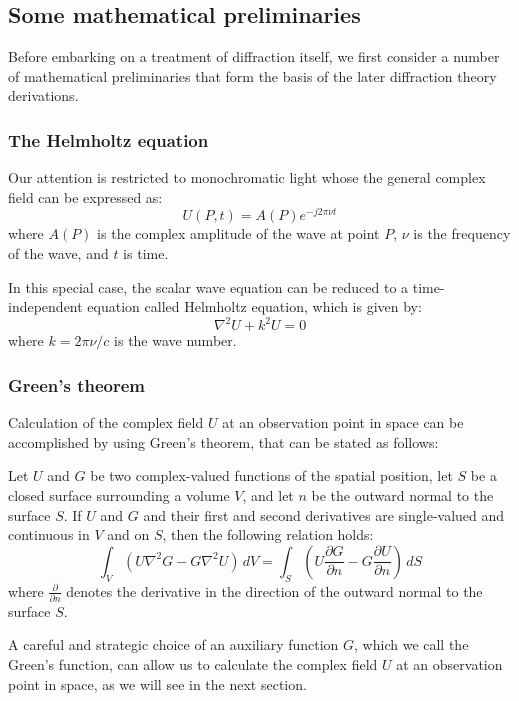 \documentclass{article}
\begin{document}
\subsection{Some mathematical preliminaries}
Before embarking on a treatment of diffraction itself, we first consider a number of
mathematical preliminaries that form the basis of the later diffraction theory derivations.
\subsubsection{The Helmholtz equation}
Our attention is restricted to monochromatic light whose the general complex field can be expressed as:
\begin{equation}
    U(P, t) = A(P) e^{-j2\pi \nu t}
\end{equation}
where $A(P)$ is the complex amplitude of the wave at point $P$, $\nu$ is the frequency of the wave, and $t$ is time.

In this special case, the scalar wave equation can be reduced to a time-independent equation called Helmholtz equation, which is given by:
\begin{equation}\label{eq:helmholtz_equation}
\nabla^2 U + k^2 U = 0
\end{equation}
where $k = 2\pi \nu / c$ is the wave number.

\subsubsection{Green's theorem}
Calculation of the complex field $U$ at an observation point in space can be accomplished by using Green's theorem, that can be stated as follows:
\begin{theorem}
Let $U$ and $G$ be two complex-valued functions of the spatial position, let $S$ be a closed surface surrounding a volume $V$, and let $n$ be the outward normal to the surface $S$. If $U$ and $G$ and their first and second derivatives are single-valued and continuous in $V$ and on $S$, then the following relation holds:
\begin{equation}\label{eq:green_theorem}
\int_V (U \nabla^2 G - G \nabla^2 U) \, dV = \int_S \left( U \frac{\partial G}{\partial n} - G \frac{\partial U}{\partial n} \right) \,dS
\end{equation}
where $\frac{\partial}{\partial n}$ denotes the derivative in the direction of the outward normal to the surface $S$.
\end{theorem}
A careful and strategic choice of an auxiliary function $G$, which we call the Green's function, can allow us to calculate the complex field $U$ at an observation point in space, as we will see in the next section.
\end{document}
